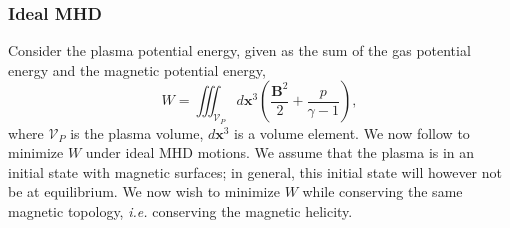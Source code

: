 \documentclass[my_thesis.tex]{subfiles}
\begin{document}
\subsubsection{Ideal MHD} \label{energy principle ideal mhd}
Consider the plasma potential energy, given as the sum of the gas potential energy and the magnetic potential energy, 
\begin{equation}
	W = \iiint_{\mathcal{V}_P} d\mathbf{x}^3 \left(\frac{\mathbf{B}^2}{2} + \frac{p}{\gamma-1}\right), \label{eq. energy functional}
\end{equation}
where $\mathcal{V}_P$ is the plasma volume, $d\mathbf{x}^3$ is a volume element. We now follow \citet{kruskalEquilibriumMagneticallyConfined1958} to minimize $W$ under ideal MHD motions. We assume that the plasma is in an initial state with magnetic surfaces; in general, this initial state will however not be at equilibrium. We now wish to minimize $W$ while conserving the same magnetic topology, \textit{i.e.} conserving the magnetic helicity.
\end{document}
